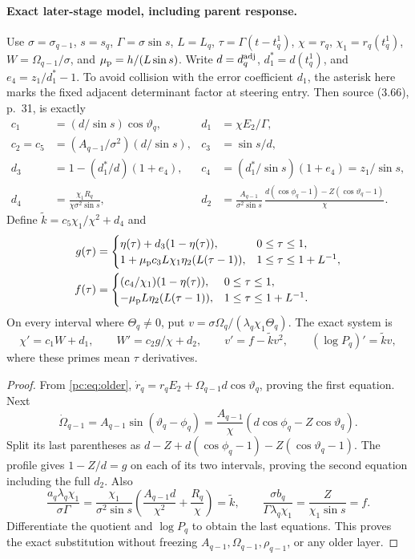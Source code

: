 \paragraph{Exact later-stage model, including parent response.}
Use $\sigma=\sigma_{q-1}$, $s=s_q$, $\Gamma=\sigma\sin s$, $L=L_q$, $\tau=\Gamma(t-t_q^1)$, $\chi=r_q$, $\chi_1=r_q(t_q^1)$, $W=\Omega_{q-1}/\sigma$, and $\mu_{\rm p}=h/(L\sin s)$. Write $d=d_q^{\rm adj}$, $d_1^*=d(t_q^1)$, and $e_4=z_1/d_1^*-1$. To avoid collision with the error coefficient $d_1$, the asterisk here marks the fixed adjacent determinant factor at steering entry. Then source (3.66), p.~31, is exactly
\begin{align}
 c_1&=(d/\sin s)\cos\vartheta_q,&d_1&=\chi E_2/\Gamma,\nonumber\\
 c_2=c_5&=(A_{q-1}/\sigma^2)(d/\sin s),&c_3&=\sin s/d,\nonumber\\
 d_3&=1-(d_1^*/d)(1+e_4),&c_4&=(d_1^*/\sin s)(1+e_4)=z_1/\sin s,\label{pc:eq:model-coeff}\\
 d_4&=\frac{\chi_1R_q}{\chi\sigma^2\sin s},&
 d_2&=\frac{A_{q-1}}{\sigma^2\sin s}\,
 \frac{d(\cos\phi_q-1)-Z(\cos\vartheta_q-1)}\chi.\nonumber
\end{align}
Define $\widetilde k=c_5\chi_1/\chi^2+d_4$ and
\begin{align*}
 g(\tau)&=\begin{cases}\eta(\tau)+d_3(1-\eta(\tau)),&0\le\tau\le1,\\
 1+\mu_{\rm p}c_3L\chi_1\eta_2(L(\tau-1)),&1\le\tau\le1+L^{-1},\end{cases}\\
 f(\tau)&=\begin{cases}(c_4/\chi_1)(1-\eta(\tau)),&0\le\tau\le1,\\
 -\mu_{\rm p}L\eta_2(L(\tau-1)),&1\le\tau\le1+L^{-1}.\end{cases}
\end{align*}
On every interval where $\Theta_q\ne0$, put $v=\sigma\Omega_q/(\lambda_q\chi_1\Theta_q)$. The exact system is
\begin{equation}\label{pc:eq:model}
 \chi'=c_1W+d_1,\qquad W'=c_2g/\chi+d_2,\qquad
 v'=f-\widetilde k v^2,\qquad (\log P_q)'=\widetilde k v,
\end{equation}
where these primes mean $\tau$ derivatives.
\begin{proof}
From \eqref{pc:eq:older}, $\dot r_q=r_qE_2+\Omega_{q-1}d\cos\vartheta_q$, proving the first equation. Next
\[
 \dot\Omega_{q-1}=A_{q-1}\sin(\vartheta_q-\phi_q)
 =\frac{A_{q-1}}\chi(d\cos\phi_q-Z\cos\vartheta_q).
\]
Split its last parentheses as $d-Z+d(\cos\phi_q-1)-Z(\cos\vartheta_q-1)$. The profile gives $1-Z/d=g$ on each of its two intervals, proving the second equation including the full $d_2$. Also
\[
 \frac{a_q\lambda_q\chi_1}{\sigma\Gamma}
 =\frac{\chi_1}{\sigma^2\sin s}
 \left(\frac{A_{q-1}d}{\chi^2}+\frac{R_q}\chi\right)
 =\widetilde k,
 \qquad \frac{\sigma b_q}{\Gamma\lambda_q\chi_1}
 =\frac{Z}{\chi_1\sin s}=f.
\]
Differentiate the quotient and $\log P_q$ to obtain the last equations. This proves the exact substitution without freezing $A_{q-1},\Omega_{q-1},\rho_{q-1}$, or any older layer.
\end{proof}

